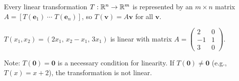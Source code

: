 \begin{theorem}
Every linear transformation $T:\mathbb{R}^n\to\mathbb{R}^m$ is represented by an $m\times n$ matrix $A=[T(\mathbf{e}_1)\;\cdots\;T(\mathbf{e}_n)]$, so $T(\mathbf{v})=A\mathbf{v}$ for all $\mathbf{v}$.
\end{theorem}

\begin{example}
$T(x_1,x_2)=(2x_1,\,x_2-x_1,\,3x_1)$ is linear with matrix $A=\begin{pmatrix}2&0\\-1&1\\3&0\end{pmatrix}$.

Note: $T(\mathbf{0})=\mathbf{0}$ is a necessary condition for linearity. If $T(\mathbf{0})\neq\mathbf{0}$ (e.g., $T(x)=x+2$), the transformation is not linear.
\end{example}
